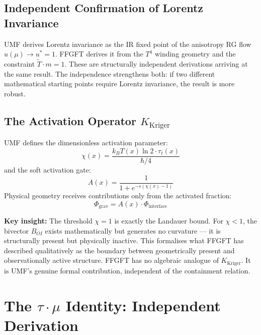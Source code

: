 \subsection{Independent Confirmation of Lorentz Invariance}

UMF derives Lorentz invariance as the IR fixed point of the anisotropy RG
flow $u(\mu) \to u^* = 1$. FFGFT derives it from the $T^4$ winding geometry
and the constraint $\tilde{T}\cdot m = 1$. These are structurally independent
derivations arriving at the same result. The independence strengthens both:
if two different mathematical starting points require Lorentz invariance,
the result is more robust.

\subsection{The Activation Operator \texorpdfstring{$K_\text{Kriger}$}{K\_Kriger}}
\label{sec:kriger}

UMF defines the dimensionless activation parameter:
\begin{equation}
  \chi(x) = \frac{k_B T(x)\ln 2 \cdot \tau_t(x)}{\hbar/4}
  \tag{244.6a}
\end{equation}
and the soft activation gate:
\begin{equation}
  A(x) = \frac{1}{1+e^{-s(\chi(x)-1)}}
  \tag{244.6b}
\end{equation}
Physical geometry receives contributions only from the activated fraction:
\begin{equation}
  \Phi_\text{grav} = A(x) \cdot \Phi_\text{interface}
  \tag{244.6c}
\end{equation}

\textbf{Key insight:} The threshold $\chi = 1$ is exactly the Landauer bound.
For $\chi < 1$, the bivector $B_{OI}$ exists mathematically but generates no
curvature — it is structurally present but physically inactive. This formalises
what FFGFT has described qualitatively as the boundary between geometrically
present and observationally active structure. FFGFT has no algebraic analogue
of $K_\text{Kriger}$. It is UMF's genuine formal contribution, independent
of the containment relation.

\section{\texorpdfstring{The $\tau\cdot\mu$ Identity}{The tau.mu Identity}: Independent Derivation}

